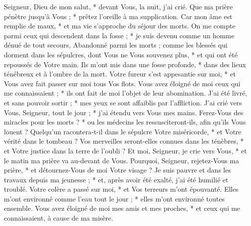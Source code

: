  Seigneur, Dieu de mon salut, * devant Vous, la nuit, j'ai crié.
\versseparator
 Que ma prière pénètre jusqu'à Vous ; * prêtez l'oreille à ma supplication.
\versseparator
 Car mon âme est remplie de maux, * et ma vie s'approche du séjour des morts.
\versseparator
 On me compte parmi ceux qui descendent dans la fosse ; * je suis devenu comme un homme dénué de tout secours,
\versseparator
 Abandonné parmi les morts ; comme les blessés qui dorment dans les sépulcres, dont Vous ne Vous souvenez plus, * et qui ont été repoussés de Votre main.
\versseparator
 Ils m'ont mis dans une fosse profonde, * dans des lieux ténébreux et à l'ombre de la mort.
\versseparator
 Votre fureur s'est appesantie sur moi, * et Vous avez fait passer sur moi tous Vos flots.
\versseparator
 Vous avez éloigné de moi ceux qui me connaissaient ; * ils ont fait de moi l'objet de leur abomination.
\versseparator
 J'ai été livré, et sans pouvoir sortir ; * mes yeux se sont affaiblis par l'affliction.
\versseparator
 J'ai crié vers Vous, Seigneur, tout le jour ; * j'ai étendu vers Vous mes mains.
\versseparator
 Ferez-Vous des miracles pour les morts ? * ou les médecins les ressusciteront-ils, afin qu'ils Vous louent ?
\versseparator
 Quelqu'un racontera-t-il dans le sépulcre Votre miséricorde, * et Votre vérité dans le tombeau ?
\versseparator
 Vos merveilles seront-elles connues dans les ténèbres, * et Votre justice dans la terre de l'oubli ?
\versseparator
 Et moi, Seigneur, je crie vers Vous, * et le matin ma prière va au-devant de Vous.
\versseparator
 Pourquoi, Seigneur, rejetez-Vous ma prière, * et détournez-Vous de moi Votre visage ?
\versseparator
 Je suis pauvre et dans les travaux depuis ma jeunesse ; * et, après avoir été exalté, j'ai été humilié et troublé.
\versseparator
 Votre colère a passé sur moi, * et Vos terreurs m'ont épouvanté.
\versseparator
 Elles m'ont environné comme l'eau tout le jour ; * elles m'ont environné toutes ensemble.
\versseparator
 Vous avez éloigné de moi mes amis et mes proches, * et ceux qui me connaissaient, à cause de ma misère.